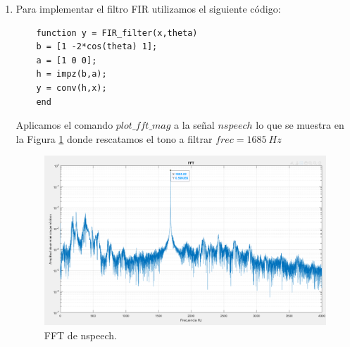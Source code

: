 \documentclass[letterpaper,onecolumn,10pt,journal,final]{IEEEtran}
\begin{document}
\begin{enumerate}[1)]
    \item %
    Para implementar el filtro FIR utilizamos el siguiente código:
    \begin{lstlisting}
    function y = FIR_filter(x,theta)
    b = [1 -2*cos(theta) 1];
    a = [1 0 0];
    h = impz(b,a);
    y = conv(h,x);
    end
    \end{lstlisting}
    
    Aplicamos el comando $plot\_fft\_mag$ a la señal $nspeech$ lo que se muestra en la Figura \ref{fig:I3_FFT} donde rescatamos el tono a filtrar $frec = 1685 ~Hz$
    \begin{figure}[H]
        \centering
        \includegraphics[width=0.75 \linewidth]{Figuras/I_3)_FFT.png}
        \caption{FFT de nspeech.}
        \label{fig:I3_FFT}
    \end{figure}


\end{enumerate}
\end{document}
